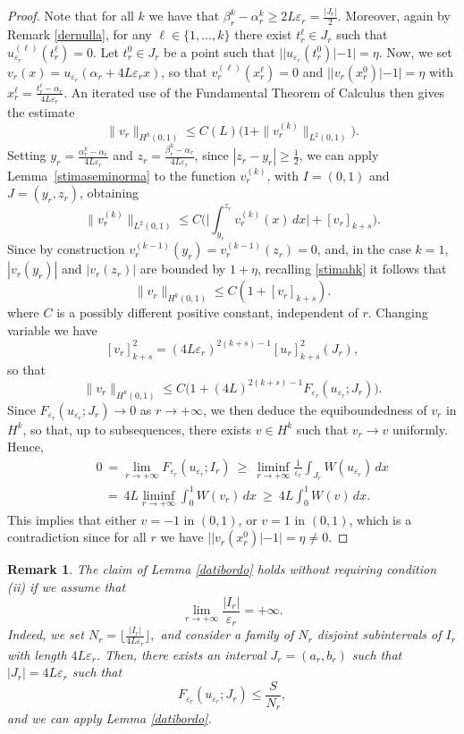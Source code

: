 \documentclass{article}
\newtheorem{remark}[lemma]{Remark}
\newcommand{\e}{\varepsilon}
\begin{document}
\begin{proof}
 Note that for all $k$ we have that $\beta^k_r-\alpha^k_r\geq 2L\e_r=\frac{|J_r|}{2}$. 
Moreover, again by Remark \ref{dernulla}, for any $\ell\in\{1,\dots, k\}$ there exist $t^\ell_r\in J_r$ such that $u^{(\ell)}_{\e_r}(t^\ell_r)=0$. Let $t^0_r\in J_r$ be a point such that $||u_{\e_r}(t^0_r)|-1|=\eta$.  
Now, we set $v_r(x)=u_{\e_r}(\alpha_r+4L\e_r x)$, so that  
$v^{(\ell)}_r(x_r^\ell)=0$ and $||v_r(x_r^0)|-1|=\eta$ with $x_r^\ell=\frac{t^\ell_r-\alpha_r}{4L\e_r}$. An iterated use of the Fundamental Theorem of Calculus then gives the estimate   
\begin{equation}\label{stimahk}
\|v_r\|_{H^k(0,1)}\leq C(L) \big(1+\|v_r^{(k)}\|_{L^2(0,1)}\big).
\end{equation} 
Setting $y_r=\frac{\alpha^k_r-\alpha_r}{4L\e_r}$ and 
$z_r=\frac{\beta^k_r-\alpha_r}{4L\e_r}$, since $|z_r-y_r|\geq \frac{1}{2}$, we can apply Lemma~\ref{stimaseminorma} to the function $v_r^{(k)}$, with $I=(0,1)$ and  $J=(y_r,z_r)$, obtaining 
$$\|v_r^{(k)}\|_{L^2(0,1)}\leq C\bigg(\Big|\int_{y_r}^{z_r} v_r^{(k)}(x)\, dx\Big| + [v_r]_{k+s}\bigg).$$ 
Since by construction $v^{(k-1)}_r(y_r)=v^{(k-1)}_r(z_r)=0$, and, in the case $k=1$, $|v_r(y_r)|$ and $|v_r(z_r)|$ are bounded by $1+\eta$, recalling \eqref{stimahk} it follows that 
$$\|v_r\|_{H^k(0,1)}\leq C (1+[v_r]_{k+s}).$$
where $C$ is a possibly different positive constant, independent of $r$. 
Changing variable we have
$$[v_r]^2_{k+s}=(4L\e_r)^{2(k+s)-1}[u_r]^2_{k+s}(J_r),$$
so that 
$$\|v_r\|_{H^k(0,1)}\leq C \big(1+ (4L)^{2(k+s)-1}F_{\e_r}(u_{\e_r};J_r)\big).$$ 
Since $F_{\e_r}(u_{\e_r};J_r)\to 0$ as $r\to+\infty$,  
we then deduce 
the equiboundedness of $v_r$ in $H^k$, so that, up to subsequences,  there exists $v\in H^k$ such that $v_r\to v$ uniformly. Hence, 
\begin{eqnarray*}
&&0\ =\lim_{r\to+\infty}F_{\e_r}(u_{\e_r};I_r)\ \geq\ \liminf_{r\to+\infty}\frac{1}{\e_r}\int_{J_r} W(u_{\e_r})\, dx\\ &&\ \ \ =\ 4L\liminf_{r\to+\infty}\int_0^1 W(v_r)\, dx\ 
\geq\  4L\int_0^1 W(v)\, dx.
\end{eqnarray*}
This implies that either $v=-1$ in $(0,1)$, or $v=1$ in $(0,1)$, which is a contradiction since 
for all $r$ we have $||v_r(x_r^0)|-1|=\eta\neq 0$. 
\end{proof}

\begin{remark}\rm
The claim of Lemma \ref{datibordo}  holds without requiring condition (ii) if we assume that  
$$\lim_{r\to+\infty}\frac{|I_{r}|}{\e_r}=+\infty.$$ 
Indeed, we set $N_r=\lfloor \frac{|I_r|}{4L\e_r}\rfloor,$ and consider a family of $N_r$ disjoint subintervals of $I_r$ with length $4L\e_r$. Then, there exists an interval $J_r=(a_r,b_r)$ such that $|J_r|=4L\e_r$ such that 
$$F_{\e_r}(u_{\e_r};J_r)\leq \frac{S}{N_r},$$ and we can apply Lemma \ref{datibordo}.  
\end{remark}
\end{document}
